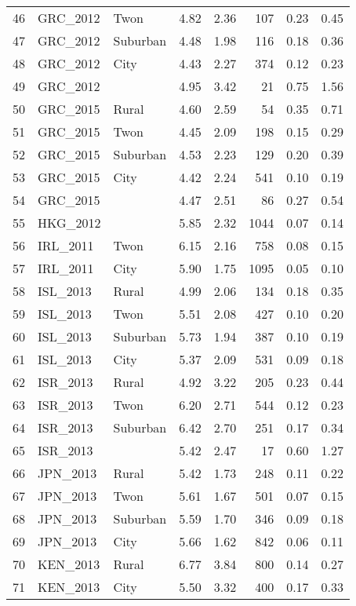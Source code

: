 \documentclass[12pt, titlepage]{article}
\begin{document}
\begin{table}[ht]
\begin{tabular}{rllrrrrr}
		46 & GRC\_2012 & Twon & 4.82 & 2.36 & 107 & 0.23 & 0.45 \\ 
		47 & GRC\_2012 & Suburban & 4.48 & 1.98 & 116 & 0.18 & 0.36 \\ 
		48 & GRC\_2012 & City & 4.43 & 2.27 & 374 & 0.12 & 0.23 \\ 
		49 & GRC\_2012 &  & 4.95 & 3.42 &  21 & 0.75 & 1.56 \\ 
		50 & GRC\_2015 & Rural & 4.60 & 2.59 &  54 & 0.35 & 0.71 \\ 
		51 & GRC\_2015 & Twon & 4.45 & 2.09 & 198 & 0.15 & 0.29 \\ 
		52 & GRC\_2015 & Suburban & 4.53 & 2.23 & 129 & 0.20 & 0.39 \\ 
		53 & GRC\_2015 & City & 4.42 & 2.24 & 541 & 0.10 & 0.19 \\ 
		54 & GRC\_2015 &  & 4.47 & 2.51 &  86 & 0.27 & 0.54 \\ 
		55 & HKG\_2012 &  & 5.85 & 2.32 & 1044 & 0.07 & 0.14 \\ 
		56 & IRL\_2011 & Twon & 6.15 & 2.16 & 758 & 0.08 & 0.15 \\ 
		57 & IRL\_2011 & City & 5.90 & 1.75 & 1095 & 0.05 & 0.10 \\ 
		58 & ISL\_2013 & Rural & 4.99 & 2.06 & 134 & 0.18 & 0.35 \\ 
		59 & ISL\_2013 & Twon & 5.51 & 2.08 & 427 & 0.10 & 0.20 \\ 
		60 & ISL\_2013 & Suburban & 5.73 & 1.94 & 387 & 0.10 & 0.19 \\ 
		61 & ISL\_2013 & City & 5.37 & 2.09 & 531 & 0.09 & 0.18 \\ 
		62 & ISR\_2013 & Rural & 4.92 & 3.22 & 205 & 0.23 & 0.44 \\ 
		63 & ISR\_2013 & Twon & 6.20 & 2.71 & 544 & 0.12 & 0.23 \\ 
		64 & ISR\_2013 & Suburban & 6.42 & 2.70 & 251 & 0.17 & 0.34 \\ 
		65 & ISR\_2013 &  & 5.42 & 2.47 &  17 & 0.60 & 1.27 \\ 
		66 & JPN\_2013 & Rural & 5.42 & 1.73 & 248 & 0.11 & 0.22 \\ 
		67 & JPN\_2013 & Twon & 5.61 & 1.67 & 501 & 0.07 & 0.15 \\ 
		68 & JPN\_2013 & Suburban & 5.59 & 1.70 & 346 & 0.09 & 0.18 \\ 
		69 & JPN\_2013 & City & 5.66 & 1.62 & 842 & 0.06 & 0.11 \\ 
		70 & KEN\_2013 & Rural & 6.77 & 3.84 & 800 & 0.14 & 0.27 \\ 
		71 & KEN\_2013 & City & 5.50 & 3.32 & 400 & 0.17 & 0.33 \\ 

\end{tabular}
\end{table}
\end{document}
